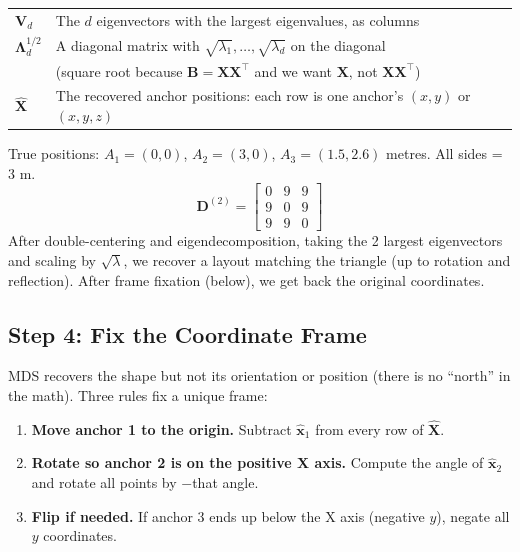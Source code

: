 \documentclass[11pt,a4paper]{article}
\newcommand{\vect}[1]{\bm{#1}}
\newcommand{\mat}[1]{\mathbf{#1}}
\begin{document}
\begin{symbols}
\begin{tabular}{ll}
$\mat{V}_d$ & The $d$ eigenvectors with the largest eigenvalues, as columns \\
$\mat{\Lambda}_d^{1/2}$ & A diagonal matrix with $\sqrt{\lambda_1}, \ldots, \sqrt{\lambda_d}$ on the diagonal \\
   & (square root because $\mat{B} = \mat{X}\mat{X}^\top$ and we want $\mat{X}$, not $\mat{X}\mat{X}^\top$) \\
$\hat{\mat{X}}$ & The recovered anchor positions: each row is one anchor's $(x,y)$ or $(x,y,z)$ \\
\end{tabular}
\end{symbols}

\begin{worked}
True positions: $A_1=(0,0)$, $A_2=(3,0)$, $A_3=(1.5,2.6)$ metres. All sides = 3 m.
\[
\mat{D}^{(2)} = \begin{bmatrix}0&9&9\\9&0&9\\9&9&0\end{bmatrix}
\]
After double-centering and eigendecomposition, taking the 2 largest eigenvectors and scaling by $\sqrt{\lambda}$, we recover a layout matching the triangle (up to rotation and reflection). After frame fixation (below), we get back the original coordinates.
\end{worked}

\subsection{Step 4: Fix the Coordinate Frame}

MDS recovers the shape but not its orientation or position (there is no ``north'' in the math). Three rules fix a unique frame:

\begin{enumerate}[leftmargin=2em]
  \item \textbf{Move anchor 1 to the origin.} Subtract $\hat{\vect{x}}_1$ from every row of $\hat{\mat{X}}$.
  \item \textbf{Rotate so anchor 2 is on the positive X axis.} Compute the angle of $\hat{\vect{x}}_2$ and rotate all points by $-$that angle.
  \item \textbf{Flip if needed.} If anchor 3 ends up below the X axis (negative $y$), negate all $y$ coordinates.
\end{enumerate}
\end{document}
